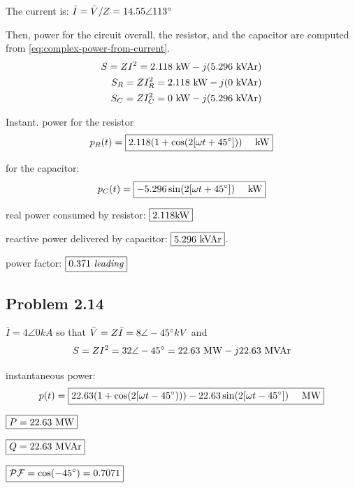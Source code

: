 \documentclass{homework}
\begin{document}
The current is: $\bar{I} = \bar{V} / Z = 14.55 \angle 113\degree$

Then, power for the circuit overall, the resistor, and the capacitor
are computed from \ref{eq:complex-power-from-current}.
\begin{align*}
    S = ZI^2 = 2.118 \text{ kW} - j (5.296 \text{ kVAr}) \\
    S_R = ZI_R^2 = 2.118 \text{ kW} - j (0 \text{ kVAr}) \\
    S_C = ZI_C^2 = 0 \text{ kW} - j (5.296 \text{ kVAr})
\end{align*}

\begin{letterenum}
    \item Instant. power for the resistor
    \begin{equation*}
        p_R(t) = \boxed{2.118 (1 + \cos(2[\omega t + 45 \degree])) \quad \text{ kW}}
    \end{equation*}
    \item for the capacitor:
    \begin{equation*}
        p_C(t) = \boxed{-5.296 \sin(2[\omega t + 45 \degree]) \quad \text{ kW}}
    \end{equation*}
    \item real power consumed by resistor: $\boxed{$2.118kW$}$ 
    \item reactive power delivered by capacitor: $\boxed{$5.296 kVAr$}$.
    \item power factor: $\boxed{$0.371 $\it{leading}}$
\end{letterenum}

\subsection{Problem 2.14}
$\bar{I} = 4\angle 0 kA$ so that
$\bar{V} = Z \bar{I} = 8 \angle -45 \degree kV$ and
\begin{equation*}
    S = ZI^2 = 32\angle-45 \degree = 22.63 \text{ MW} - j22.63 \text{ MVAr}
\end{equation*}
\begin{letterenum}
    \item instantaneous power:
    \begin{equation*}
        p(t) = \boxed{22.63 (1 + \cos(2[\omega t - 45 \degree)))
            - 22.63 \sin(2[\omega t - 45 \degree]) \quad \text{ MW}}
    \end{equation*}
    \item $\boxed{P = 22.63 \text{ MW}}$
    \item $\boxed{Q = 22.63 \text{ MVAr}}$
    \item $\boxed{\mathcal{PF} = \cos(-45 \degree) = 0.7071}$

\end{letterenum}
\end{document}
